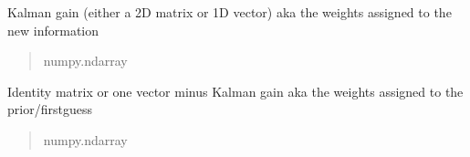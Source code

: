 \documentclass[letterpaper,10pt,english]{sphinxmanual}
\begin{document}
\begin{fulllineitems}
\begin{fulllineitems}
\begin{fulllineitems}
\end{fulllineitems}


\begin{fulllineitems}
\label{\detokenize{kalman:glomar_gridding.autoregressive_kalman.KalmanOut.kalman_gain_from_new_obs}}
\pysigstartsignatures
\pysigline
{}
\pysigstopsignatures
\sphinxAtStartPar
Kalman gain (either a 2D matrix or 1D vector)
aka the weights assigned to the new information
\begin{quote}\begin{description}
\sphinxAtStartPar
numpy.ndarray

\end{description}\end{quote}

\end{fulllineitems}


\begin{fulllineitems}
\label{\detokenize{kalman:glomar_gridding.autoregressive_kalman.KalmanOut.wgts_from_ar_forecast}}
\pysigstartsignatures
\pysigline
{}
\pysigstopsignatures
\sphinxAtStartPar
Identity matrix or one vector minus Kalman gain
aka the weights assigned to the prior/first\sphinxhyphen{}guess
\begin{quote}\begin{description}
\sphinxAtStartPar
numpy.ndarray

\end{description}\end{quote}

\end{fulllineitems}


\end{fulllineitems}



\end{fulllineitems}
\end{document}
